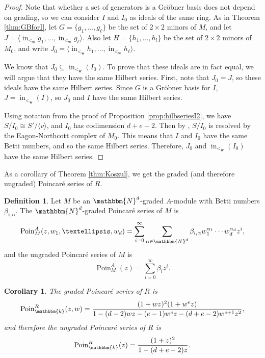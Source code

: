 \documentclass[12pt,reqno]{amsart}
\newtheorem{corollary}[theorem]{Corollary}
\theoremstyle{definition}
\newtheorem{definition}[theorem]{Definition}
\theoremstyle{remark}
\newcommand{\initial}{\operatorname{in}}
\newcommand{\Poin}{\operatorname{Poin}}
\newcommand{\bbN}{\mathbbm{N}}
\newcommand{\bbk}{\mathbbm{k}}
\newcommand{\bfw}{{\mathbf{w}}}
\newcommand{\ideal}[1]{{\langle #1 \rangle}}
\newcommand{\set}[1]{{\{ #1 \}}}
\begin{document}
\begin{proof}
    Note that whether a set of generators is a Gr\"obner basis does not depend on grading, so we can consider $I$ and $I_0$ as ideals of the same ring.  As in Theorem \ref{thm:GBforI}, let $G = \set{g_1, \ldots, g_\ell}$ be the set of $2 \times 2$ minors of $M$, and let $J = \ideal{\initial_{<_\bfw} g_1, \ldots, \initial_{<_\bfw} g_\ell}$.  Also let $H = \{h_1,\ldots,h_l\}$ be the set of $2\times 2$ minors of $M_0$, and write $J_0 = \ideal{\initial_{<_\bfw} h_1, \ldots, \initial_{<_\bfw} h_\ell}$.

    We know that $J_0 \subseteq \initial_{<_\bfw}(I_0)$.  To prove that these ideals are in fact equal, we will argue that they have the same Hilbert series.  First, note that $J_0 = J$, so these ideals have the same Hilbert series.  Since $G$ is a Gr\"obner basis for $I$, $J = \initial_{<_\bfw}(I)$, so $J_0$ and $I$ have the same Hilbert series.

    Using notation from the proof of Proposition \ref{prop:hilbseriesI2}, we have $S/I_0\cong S'/\langle v\rangle$, and $I_0$ has codimension $d+e-2$.  Then by \cite[Theorem A2.60]{eGeomOSyz}, $S/I_0$ is resolved by the Eagon-Northcott complex of $M_0$.  This means that $I$ and $I_0$ have the same Betti numbers, and so the same Hilbert series.  Therefore, $J_0$ and $\initial_{<_\bfw}(I_0)$ have the same Hilbert series.
\end{proof}

As a corollary of Theorem \ref{thm:Koszul}, we get the graded (and therefore ungraded) Poincar\'e series of $R$.

\begin{definition}
Let $M$ be an $\bbN^d$-graded $A$-module with Betti numbers $\beta_{i,\alpha}$. The $\bbN^d$-graded Poincar\'e series of $M$ is 
\[\Poin_M^A(z,w_1, \ldots, w_d) = \sum\limits_{i=0}^\infty \sum\limits_{\alpha \in \bbN^d} \beta_{i,\alpha} w_1^{\alpha_1} \cdots w_d^{\alpha_d} z^i,\]
and the ungraded Poincar\'e series of $M$ is 
\[
\Poin_M^A(z) = \sum\limits_{i=0}^\infty \beta_i z^i.
\]
\end{definition}

\begin{corollary}\label{cor:gradedpoincare}
The graded Poincar\'e series of $R$ is 
\[\Poin^R_\bbk(z,w) = \dfrac{(1+wz)^2(1+w^ez)}{1-(d-2)wz-(e-1)w^ez-(d+e-2)w^{e+1}z^2},\]
and therefore the ungraded Poincar\'e series of $R$ is 
\[\Poin^R_\bbk(z) = \frac{(1+z)^2}{1-(d+e-2)z}.\]
\end{corollary}
\end{document}
